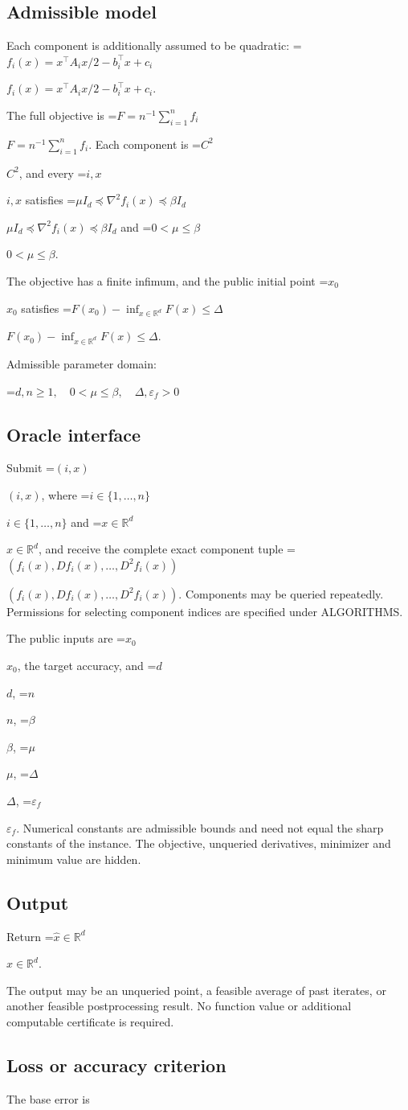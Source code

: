 \documentclass[10pt,a4paper]{article}
\newcommand{\AtlasMath}[1]{\par\begingroup\centering\setbox0=\hbox{$\displaystyle #1$}\ifdim\wd0>1.4\linewidth\typeout{ATLAS WIDE FORMULA: \the\wd0}\fi\ifdim\wd0>\linewidth\resizebox{\linewidth}{!}{\box0}\else\box0\fi\par\endgroup}
\newcommand{\AtlasInlineMath}[1]{\begingroup\setbox0=\hbox{$#1$}\ifdim\wd0>.4\linewidth\endgroup\AtlasMath{#1}\else\endgroup$#1$\fi}
\begin{document}
\subsection{Admissible model}
Each component is additionally assumed to be quadratic: \AtlasInlineMath{f_i(x)=x^\top A_i x/2-b_i^\top x+c_i}.

The full objective is \AtlasInlineMath{F=n^{-1}\sum_{i=1}^n f_i}. Each component is \AtlasInlineMath{C^2}, and every \AtlasInlineMath{i,x} satisfies \AtlasInlineMath{\mu I_d\preceq\nabla^2f_i(x)\preceq\beta I_d} and \AtlasInlineMath{0<\mu\le\beta}.

The objective has a finite infimum, and the public initial point \AtlasInlineMath{x_0} satisfies \AtlasInlineMath{F(x_0)-\inf_{x\in \mathbb{R}^d}F(x)\le\Delta}.

Admissible parameter domain:


\AtlasMath{d,n\ge1,\quad0<\mu\le\beta,\quad\Delta,\varepsilon_f>0}


\subsection{Oracle interface}
Submit \AtlasInlineMath{(i,x)}, where \AtlasInlineMath{i\in\{1,\ldots,n\}} and \AtlasInlineMath{x\in\mathbb{R}^d}, and receive the complete exact component tuple \AtlasInlineMath{(f_i(x),Df_i(x),\ldots,D^{2}f_i(x))}. Components may be queried repeatedly. Permissions for selecting component indices are specified under ALGORITHMS.

The public inputs are \AtlasInlineMath{x_0}, the target accuracy, and \AtlasInlineMath{d}, \AtlasInlineMath{n}, \AtlasInlineMath{\beta}, \AtlasInlineMath{\mu}, \AtlasInlineMath{\Delta}, \AtlasInlineMath{\varepsilon_f}. Numerical constants are admissible bounds and need not equal the sharp constants of the instance. The objective, unqueried derivatives, minimizer and minimum value are hidden.

\subsection{Output}
Return \AtlasInlineMath{\widehat{x}\in \mathbb{R}^d}.

The output may be an unqueried point, a feasible average of past iterates, or another feasible postprocessing result. No function value or additional computable certificate is required.

\subsection{Loss or accuracy criterion}
The base error is
\end{document}
